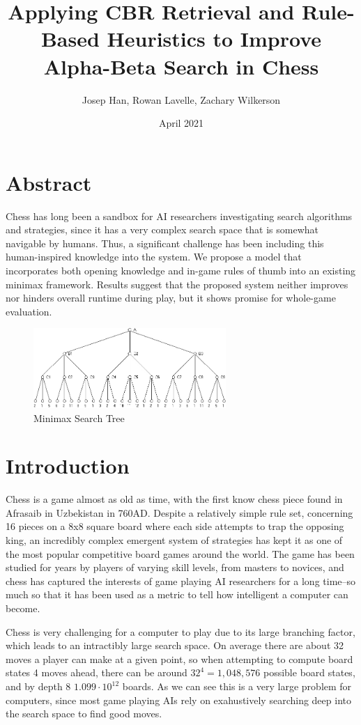 \documentclass[letterpaper]{article}
\title{Applying CBR Retrieval and Rule-Based Heuristics to Improve Alpha-Beta Search in Chess}
\author{Josep Han, Rowan Lavelle, Zachary Wilkerson}
\date{April 2021}
\begin{document}
\maketitle
\section{Abstract}
Chess has long been a sandbox for AI researchers investigating search algorithms and strategies, since it has a very complex search space that is somewhat navigable by humans.  Thus, a significant challenge has been including this human-inspired knowledge into the system.  We propose a model that incorporates both opening knowledge and in-game rules of thumb into an existing minimax framework.  Results suggest that the proposed system neither improves nor hinders overall runtime during play, but it shows promise for whole-game evaluation.

\begin{figure}
    \centering
    \includegraphics[width=0.65\textwidth]{minimax.jpg}
    \caption{Minimax Search Tree}
    \label{minimax}
\end{figure}

\section{Introduction}
Chess is a game almost as old as time, with the first know chess piece found in Afrasaib in Uzbekistan in 760AD. Despite a relatively simple rule set, concerning 16 pieces on a 8x8 square board where each side attempts to trap the opposing king, an incredibly complex emergent system of strategies has kept it as one of the most popular competitive board games around the world. The game has been studied for years by players of varying skill levels, from masters to novices, and chess has captured the interests of game playing AI researchers for a long time--so much so that it has been used as a metric to tell how intelligent a computer can become.

Chess is very challenging for a computer to play due to its large branching factor, which leads to an intractibly large search space.  On average there are about 32 moves a player can make at a given point, so when attempting to compute board states 4 moves ahead, there can be around $32^4=1,048,576$ possible board states, and by depth 8 $1.099 \cdot 10^{12}$ boards. As we can see this is a very large problem for computers, since most game playing AIs rely on exahustively searching deep into the search space to find good moves.
\end{document}
